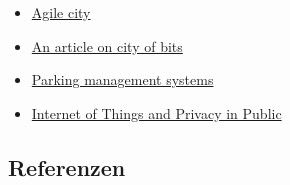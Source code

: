 \documentclass[
]{book}
\providecommand{\tightlist}{%
  \setlength{\itemsep}{0pt}\setlength{\parskip}{0pt}}
\begin{document}
\begin{itemize}
\tightlist
\item
  \href{https://agile-city.com/agile-city-research/digital-tools-for-participatory-led-design/}{Agile city}
\item
  \href{https://theconversation.com/surprise-digital-space-isnt-replacing-public-space-and-might-even-help-make-it-better-87173}{An article on city of bits}
\item
  \href{https://archer-soft.com/blog/how-build-real-time-parking-availability-system}{Parking management systems}
\item
  \href{https://jsis.washington.edu/news/internet-of-things-and-privacy-in-public/}{Internet of Things and Privacy in Public}
\end{itemize}

\hypertarget{referenzen-6}{%
\subsection*{Referenzen}\label{referenzen-6}}
\end{document}

